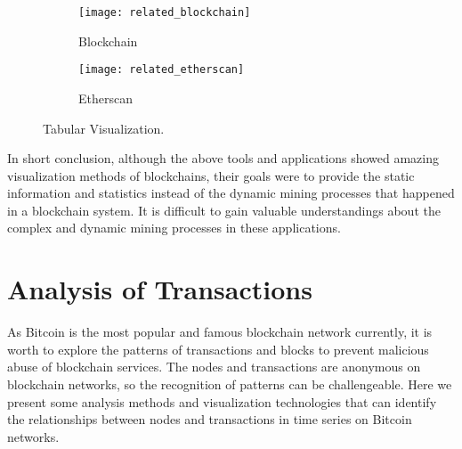 \begin{figure}[htb]
    \centering
    \begin{subfigure}[b]{0.45\textwidth}
        \centering
        \texttt{[image: related\_blockchain]}
        \caption{Blockchain}
    \end{subfigure}
    \hfill
    \begin{subfigure}[b]{0.45\textwidth}
        \centering
        \texttt{[image: related\_etherscan]}
        \caption{Etherscan}
    \end{subfigure}

    \caption{Tabular Visualization.}
    \label{fig:tabular visualization}
\end{figure}

In short conclusion, although the above tools and applications showed amazing visualization methods of blockchains, their goals were to provide the static information and statistics instead of the dynamic mining processes that happened in a blockchain system. It is difficult to gain valuable understandings about the complex and dynamic mining processes in these applications.

\section{Analysis of Transactions}

As Bitcoin is the most popular and famous blockchain network currently, it is worth to explore the patterns of transactions and blocks to prevent malicious abuse of blockchain services. The nodes and transactions are anonymous on blockchain networks, so the recognition of patterns can be challengeable. Here we present some analysis methods and visualization technologies that can identify the relationships between nodes and transactions in time series on Bitcoin networks.

